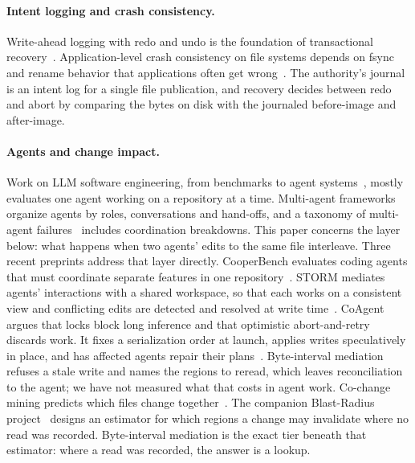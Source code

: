 \documentclass[10pt]{article}
\begin{document}
\paragraph{Intent logging and crash consistency.}
Write-ahead logging with redo and undo is the foundation of transactional recovery~\citep{mohan1992aries}. Application-level crash consistency on file systems depends on fsync and rename behavior that applications often get wrong~\citep{pillai2014allfs}. The authority's journal is an intent log for a single file publication, and recovery decides between redo and abort by comparing the bytes on disk with the journaled before-image and after-image.

\paragraph{Agents and change impact.}
Work on LLM software engineering, from benchmarks to agent systems~\citep{jimenez2024swebench,yang2024sweagent,wang2025openhands,xia2024agentless,zhang2024autocoderover}, mostly evaluates one agent working on a repository at a time. Multi-agent frameworks~\citep{hong2024metagpt,qian2024chatdev,wu2023autogen} organize agents by roles, conversations and hand-offs, and a taxonomy of multi-agent failures~\citep{cemri2025multiagent} includes coordination breakdowns. This paper concerns the layer below: what happens when two agents' edits to the same file interleave. Three recent preprints address that layer directly. CooperBench evaluates coding agents that must coordinate separate features in one repository~\citep{khatua2026cooperbench}. STORM mediates agents' interactions with a shared workspace, so that each works on a consistent view and conflicting edits are detected and resolved at write time~\citep{liu2026storm}. CoAgent argues that locks block long inference and that optimistic abort-and-retry discards work. It fixes a serialization order at launch, applies writes speculatively in place, and has affected agents repair their plans~\citep{lyu2026coagent}. Byte-interval mediation refuses a stale write and names the regions to reread, which leaves reconciliation to the agent; we have not measured what that costs in agent work. Co-change mining predicts which files change together~\citep{zimmermann2005mining}. The companion Blast-Radius project~\citep{pinckard2026blastradius} designs an estimator for which regions a change may invalidate where no read was recorded. Byte-interval mediation is the exact tier beneath that estimator: where a read was recorded, the answer is a lookup.
\end{document}

